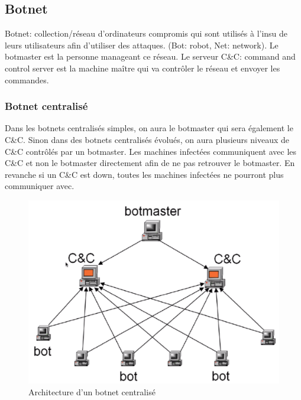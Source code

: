 \documentclass[12pt, oneside]{article}
\begin{document}
\subsection{Botnet}
Botnet: collection/réseau d'ordinateurs compromis qui sont utilisés à l'insu de leurs utilisateurs afin d'utiliser des attaques. (Bot: robot, Net: network). Le botmaster est la personne manageant ce réseau. Le serveur C\&C: command and control server est la machine maître qui va contrôler le réseau et envoyer les commandes.

\subsubsection{Botnet centralisé}
Dans les botnets centralisés simples, on aura le botmaster qui sera également le C\&C. Sinon dans des botnets centralisés évolués, on aura plusieurs niveaux de C\&C contrôlés par un botmaster. Les machines infectées communiquent avec les C\&C et non le botmaster directement afin de ne pas retrouver le botmaster. En revanche si un C\&C est down, toutes les machines infectées ne pourront plus communiquer avec.
\begin{figure}[H]
\centering
\includegraphics[scale=0.3]{centralized}
\caption{Architecture d'un botnet centralisé}
\end{figure}
\end{document}

